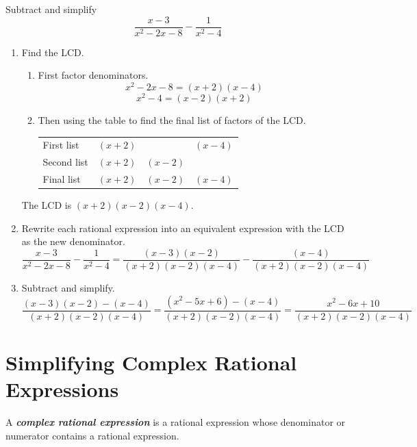 \documentclass[en,12pt]{elegantbook}
\providecommand{\tightlist}{%
  \setlength{\itemsep}{0pt}\setlength{\parskip}{0pt}}
\providecommand{\tightlist}{%
  \setlength{\itemsep}{0pt}\setlength{\parskip}{0pt}}
\let\BeginKnitrBlock\begin \let\EndKnitrBlock\end
\begin{document}
\BeginKnitrBlock{example}
\protect\hypertarget{exm:unnamed-chunk-48}{}{\label{exm:unnamed-chunk-48} }
Subtract and simplify\\
\[\dfrac{x-3}{x^2-2x-8}- \dfrac{1}{x^2-4}\]
\EndKnitrBlock{example}

\BeginKnitrBlock{solution}


\begin{enumerate}
\def\labelenumi{\arabic{enumi}.}
\tightlist
\item
  Find the LCD.

  \begin{enumerate}
  \def\labelenumii{\arabic{enumii}.}
  \item
    First factor denominators.\\
    \[x^2-2x-8=(x+2)(x-4)\]
    \[x^2-4=(x-2)(x+2)\]
  \item
    Then using the table to find the final list of factors of the LCD.

    \begin{longtable}[]{@{}lccc@{}}
    \toprule
    \endhead
    First list & \((x+2)\) & & \((x-4)\)\tabularnewline
    Second list & \((x+2)\) & \((x-2)\) &\tabularnewline
    Final list & \((x+2)\) & \((x-2)\) & \((x-4)\)\tabularnewline
    \bottomrule
    \end{longtable}
  \end{enumerate}

  The LCD is \((x+2)(x-2)(x-4)\).
\item
  Rewrite each rational expression into an equivalent expression with the LCD as the new denominator.\\
  \[
       \dfrac{x-3}{x^2-2x-8}- \dfrac{1}{x^2-4}=\dfrac{(x-3)(x-2)}{(x+2)(x-2)(x-4)}-\dfrac{(x-4)}{(x+2)(x-2)(x-4)}
   \]
\item
  Subtract and simplify.\\
  \[
       \dfrac{(x-3)(x-2)-(x-4)}{(x+2)(x-2)(x-4)}=\dfrac{(x^2-5x+6)-(x-4)}{(x+2)(x-2)(x-4)}=\dfrac{x^2-6x+10}{(x+2)(x-2)(x-4)}
   \]
\end{enumerate}
\EndKnitrBlock{solution}

\hypertarget{simplifying-complex-rational-expressions}{%
\section{Simplifying Complex Rational Expressions}\label{simplifying-complex-rational-expressions}}

A \textbf{\emph{complex rational expression}} is a rational expression whose denominator or numerator contains a rational expression.
\end{document}
